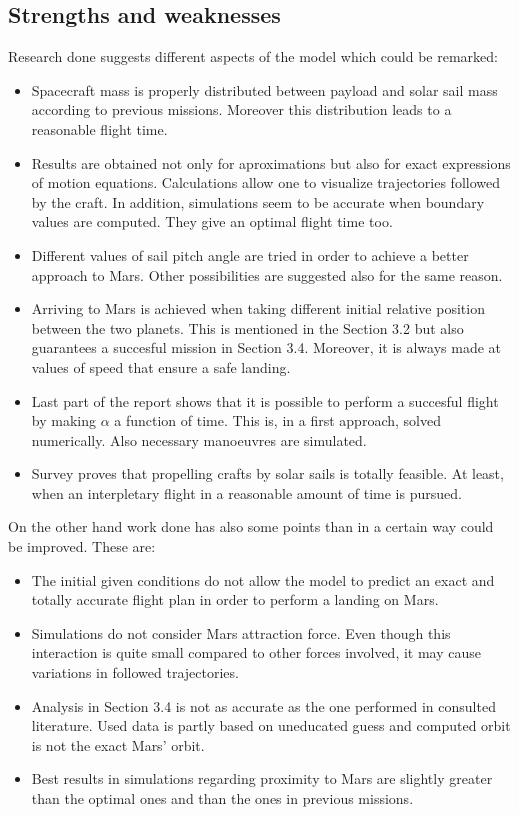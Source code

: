 \documentclass[twocolumn,12pt,a4paper]{article}
\numberwithin{equation}{section}
\begin{document}
\subsection{Strengths and weaknesses}
Research done suggests different aspects of the model which could be remarked:
\begin{itemize}
\item Spacecraft mass is properly distributed between payload and solar sail mass according to previous missions. Moreover this distribution leads to a reasonable flight time.
\item Results are obtained not only for aproximations but also for exact expressions of motion equations. Calculations allow one to visualize trajectories followed by the craft. In addition, simulations seem to be accurate when boundary values are computed. They give an optimal flight time too.
\item Different values of sail pitch angle are tried in order to achieve a better approach to Mars. Other possibilities are suggested also for the same reason. 
\item Arriving to Mars is achieved when taking different initial relative position between the two planets. This is mentioned in the Section 3.2 but also guarantees a succesful mission in Section 3.4. Moreover, it is always made at values of speed that ensure a safe landing.
\item Last part of the report shows that it is possible to perform a succesful flight by making $\alpha$ a function of time. This is, in a first approach, solved numerically. Also necessary manoeuvres are simulated. 
\item Survey proves that propelling crafts by solar sails is totally feasible. At least, when an interpletary flight in a reasonable amount of time is pursued.
\end{itemize}
On the other hand work done has also some points than in a certain way could be improved. These are:
\begin{itemize}
	\item The initial given conditions do not allow the model to predict an exact and totally accurate flight plan in order to perform a landing on Mars.
	\item Simulations do not consider Mars attraction force. Even though this interaction is quite small compared to other forces involved, it may cause variations in followed trajectories.
	\item Analysis in Section 3.4 is not as accurate as the one performed in consulted literature. Used data is partly based on uneducated guess and computed orbit is not the exact Mars' orbit.
	\item Best results in simulations regarding proximity to Mars are slightly greater than the optimal ones and than the ones in previous missions. 
\end{itemize}
\end{document}
